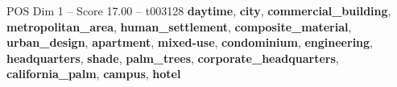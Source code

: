 \begin{textsample}{POS Dim 1 – Score 17.00 – t003128}  \label{ex:f1_pos_039}
\textbf{daytime}, \textbf{city}, \textbf{commercial\_building}, \textbf{metropolitan\_area}, \textbf{human\_settlement}, \textbf{composite\_material}, \textbf{urban\_design}, \textbf{apartment}, \textbf{mixed-use}, \textbf{condominium}, \textbf{engineering}, \textbf{headquarters}, \textbf{shade}, \textbf{palm\_trees}, \textbf{corporate\_headquarters}, \textbf{california\_palm}, \textbf{campus}, \textbf{hotel}

\end{textsample}
